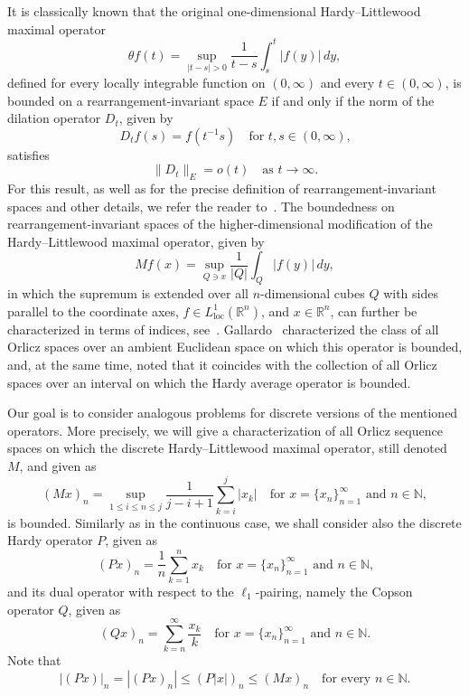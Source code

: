 \documentclass[nointlimits]{amsart}
\numberwithin{equation}{section}
\theoremstyle{plain}
\theoremstyle{definition}
\newcommand{\R}{\mathbb{R}}
\newcommand{\rn}{\R^n}
\newcommand{\N}{\mathbb{N}}
\def\loc{\operatorname{loc}}
\def\rn{\mathbb R^n}
\begin{document}
It is classically known that the original one-dimensional Hardy--Littlewood maximal operator 
\begin{equation*}
    \theta f(t) =
    \sup_{|t-s|>0}
    \frac{1}{t-s}\int_{s}^{t}
    |f(y)|\,dy,
\end{equation*}
defined for every locally integrable function on $(0,\infty)$ and every $t\in(0,\infty)$, is bounded on a rearrangement-invariant space $E$ if and only if the norm of the dilation operator $D_t$, given by
\begin{equation*}
    D_tf(s)=f(t^{-1}s)\quad\text{for $t,s\in(0,\infty)$,}
\end{equation*}
satisfies
\begin{equation*}
    \|D_t\|_{E}=o(t)\quad\text{as $t\to\infty$.}
\end{equation*}
For this result, as well as for the precise definition of rearrangement-invariant spaces and other details, we refer the reader to~\cite[Chapter II, Theorem 6.10]{Kre:82}. The boundedness on rearrangement-invariant spaces of the higher-dimensional modification of the Hardy--Littlewood maximal operator,  given by
\begin{equation*}
    Mf(x) =
    \sup_{Q\owns x}
    \frac{1}{|Q|}\int_{Q}
    |f(y)|\,dy,
\end{equation*}
in which the supremum is extended over all $n$-dimensional cubes $Q$ with sides parallel to the coordinate axes, $f\in L^{1}_{\loc}(\rn)$, and $x\in\rn$,
can further be characterized in terms of indices, see~\cite{Lor:55,Shi:65,Boy:67}.
Gallardo~\cite{Gal:88} characterized the class of all Orlicz spaces over an ambient Euclidean space on which this operator is bounded, and, at the same time, noted that it coincides with the collection of all Orlicz spaces over an interval on which the Hardy average operator is bounded.

Our goal is  to consider analogous problems for discrete versions of the mentioned  operators. 
More precisely, we will give a characterization of all Orlicz sequence spaces on which the discrete Hardy--Littlewood maximal operator, still denoted  $M$, and given as
\begin{equation*}
    (Mx)_n = \sup_{1\leq i\leq n \leq j} \frac1{j - i + 1}\sum_{k = i}^j |x_k|\quad\text{for $x=\{x_n\}_{n = 1}^\infty$ and $n\in\N$},
\end{equation*}
is bounded. Similarly as in the continuous case, we shall consider also the discrete Hardy operator $P$, given as
\begin{equation*}
    (Px)_n = \frac1{n} \sum_{k = 1}^n x_k\quad\text{for $x=\{x_n\}_{n = 1}^\infty$ and $n\in\N$,}
\end{equation*}
and its dual operator with respect to the $\ell_1$-pairing, namely the Copson operator $Q$, given as
\begin{equation*}
    (Qx)_n = \sum_{k = n}^\infty \frac{x_k}{k}\quad\text{for $x=\{x_n\}_{n = 1}^\infty$ and $n\in\N$}.
\end{equation*}
Note that
\begin{equation*}
    |(Px)|_n=|(Px)_n| \leq (P|x|)_n \leq
    (Mx)_n \quad \text{for every $n\in\N$}.
\end{equation*}
\end{document}
